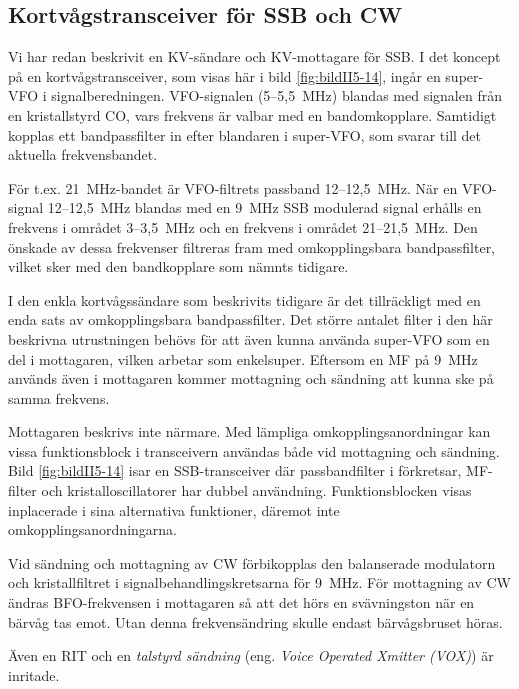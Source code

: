 \subsection{Kortvågstransceiver för SSB och CW}

Vi har redan beskrivit en KV-sändare och KV-mottagare för SSB.
I det koncept på en kortvågstransceiver, som visas här i
bild \ref{fig:bildII5-14}, ingår en super-VFO i signalberedningen.
VFO-signalen (5--5,5~MHz) blandas med signalen från en kristallstyrd CO,
vars frekvens är valbar med en bandomkopplare.
Samtidigt kopplas ett bandpassfilter in efter blandaren i super-VFO,
som svarar till det aktuella frekvensbandet.

För t.ex. 21~MHz-bandet är VFO-filtrets passband 12--12,5~MHz.
När en VFO-signal 12--12,5~MHz blandas med en 9~MHz SSB modulerad signal
erhålls en frekvens i området 3--3,5~MHz och en frekvens i området 21--21,5~MHz.
Den önskade av dessa frekvenser filtreras fram med omkopplingsbara
bandpassfilter, vilket sker med den bandkopplare som nämnts tidigare.

I den enkla kortvågssändare som beskrivits tidigare är det
tillräckligt med en enda sats av omkopplingsbara bandpassfilter.
Det större antalet filter i den här beskrivna utrustningen behövs för att
även kunna använda super-VFO som en del i mottagaren, vilken arbetar
som enkelsuper.
Eftersom en MF på 9~MHz används även i mottagaren kommer mottagning och
sändning att kunna ske på samma frekvens.

Mottagaren beskrivs inte närmare.
Med lämpliga omkopplingsanordningar kan vissa funktionsblock i
transceivern användas både vid mottagning och sändning.
Bild \ref{fig:bildII5-14} isar en SSB-transceiver där passbandfilter i
förkretsar, MF-filter och kristalloscillatorer har dubbel användning.
Funktionsblocken visas inplacerade i sina alternativa
funktioner, däremot inte omkopplingsanordningarna.

Vid sändning och mottagning av CW förbikopplas den balanserade
modulatorn och kristallfiltret i signalbehandlingskretsarna för 9~MHz.
För mottagning av CW ändras BFO-frekvensen i mottagaren så att
det hörs en svävningston när en bärvåg tas emot.
Utan denna frekvensändring skulle endast bärvågsbruset höras.

Även en RIT och en \emph{talstyrd sändning} (eng.
\emph{Voice Operated Xmitter (VOX)}) är inritade.

